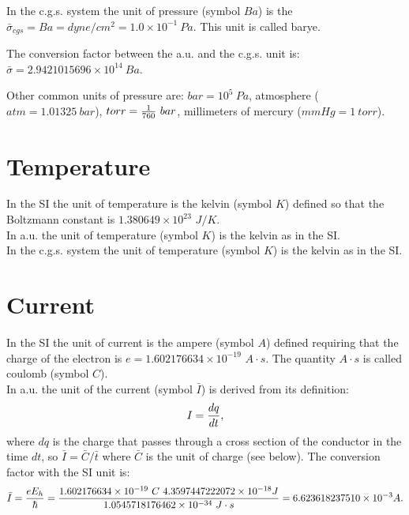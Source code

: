 \documentclass[12pt,a4paper]{article}
\def\hbarf{1.0545718176462\times 10^{-34}}
\def\e{1.602176634\times 10^{-19}}
\def\baru{4.3597447222072\times 10^{-18}}
\def\bari{6.623618237510\times 10^{-3}}
\def\barc{1.602176634\times 10^{-19}}
\def\prtopr{1.0\times 10^{-1}}
\def\barprcgs{2.9421015696\times 10^{14}}
\begin{document}
{\color{orange} In the c.g.s. system the unit of pressure (symbol $Ba$)
is the $\bar \sigma_{cgs}=Ba=dyne/cm^2 = \prtopr\ Pa$. This unit is 
called barye. 
\\
}

{\color{green} The conversion factor between the a.u. and the c.g.s. unit is:
$\bar \sigma=\barprcgs\ Ba$.
}

{\color{red} Other common units of pressure are:
$bar=10^5\ Pa$, atmosphere ($atm=1.01325\ bar$), $torr= {1\over 760}\ bar$, 
millimeters of mercury ($mmHg=1\ torr$).
}

\newpage
\section{\color{coral}Temperature}
In the SI the unit of temperature is the kelvin (symbol $K$) defined
so that the Boltzmann constant is $1.380649\times 10^{23}$ $J / K$.
\\

{\color{web-blue} In a.u. the unit of temperature (symbol $K$) is the 
kelvin as in the SI.}
\\

{\color{orange} In the c.g.s. system the unit of temperature (symbol $K$) 
is the kelvin as in the SI.}

\newpage
\section{\color{coral}Current}
In the SI the unit of current is the ampere (symbol $A$) defined
requiring that the charge of the electron is $e=\e$ $A\cdot s$.
The quantity $A\cdot s$ is called coulomb (symbol $C$).
\\

{\color{web-blue} In a.u. the unit of the current (symbol $\bar I$) is  
derived from its definition:
\begin{equation}
I={dq \over dt}, 
\end{equation}
where $dq$ is the charge that passes through a cross section of the conductor
in the time $dt$, so $\bar I = \bar C / \bar t$ where $\bar C$ is the 
unit of charge (see below). The conversion factor with the SI unit is:
\begin{equation}
\bar I = {e E_h \over \hbar}={\barc\ C\ \baru J \over 
\hbarf\  J\cdot s} = \bari A.
\end{equation}
}
\\
\end{document}
